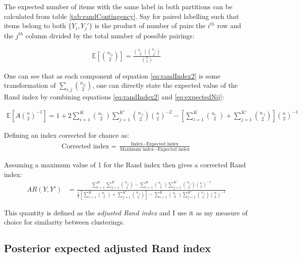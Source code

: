 \documentclass[
]{book}
\begin{document}
The expected number of items with the same label in both partitions can be calculated from table \ref{tab:randContingency}. Say for paired labelling such that items belong to both \(\{Y_i, Y_j'\}\) is the product of number of pairs the \(i^{th}\) row and the \(j^{th}\) column divided by the total number of possible pairings:

\begin{eqnarray} 
    \mathbb{E}\left[\binom{n_{ij}}{2}\right] = \frac{\binom{n_{i\cdot}}{2}\binom{n_{\cdot j}}{2}}{\binom{n}{2}}
    \label{eq:expectedNij}
    \end{eqnarray}

One can see that as each component of equation \eqref{eq:randIndex2} is some transformation of \(\sum_{i,j}\binom{n_{ij}}{2}\), one can directly state the expected value of the Rand index by combining equations \eqref{eq:randIndex2} and \eqref{eq:expectedNij}:

\begin{eqnarray}
    \mathbb{E}\left[A \binom{n}{2}^{-1}\right] = 1 + 2 \sum_{i=1}^{K} \binom{n_{i \cdot}}{2} \sum_{j=1}^{K'} \binom{n_{\cdot j}}{2} \binom{n}{2}^{-2} - \left[\sum_{i=1}^{K} \binom{n_{i \cdot}}{2} + \sum_{j=1}^{K'} \binom{n_{\cdot j}}{2}\right] \binom{n}{2}^{-1}
\end{eqnarray}

Defining an index corrected for chance as:
\begin{eqnarray}
    \text{Corrected index} = \frac{\text{Index} - \text{Expected index}}{\text{Maximum index} - \text{Expected index}}
\end{eqnarray}

Assuming a maximum value of 1 for the Rand index then gives a corrected Rand index:
\begin{eqnarray} 
    AR(Y, Y') &= \frac{\sum_{i=1}^{K}\sum_{j=1}^{K'} \binom{n_{ij}}{2} - \sum_{i=1}^{K} \binom{n_{i \cdot}}{2} \sum_{j=1}^{K'} \binom{n_{\cdot j}}{2} \binom{n}{2}^{-1}}{\frac{1}{2} \left[\sum_{i=1}^{K} \binom{n_{i \cdot}}{2} + \sum_{j=1}^{K'} \binom{n_{\cdot j}}{2}\right] - \sum_{i=1}^{K} \binom{n_{i \cdot}}{2} \sum_{j=1}^{K'} \binom{n_{\cdot j}}{2} \binom{n}{2}^{-1}}
    \label{eq:adjustedRandIndex}
\end{eqnarray}

This quantity is defined as the \emph{adjusted Rand index} and I use it as my measure of choice for similarity between clusterings.

\hypertarget{posterior-expected-adjusted-rand-index}{%
\subsection{Posterior expected adjusted Rand index}\label{posterior-expected-adjusted-rand-index}}
\end{document}
